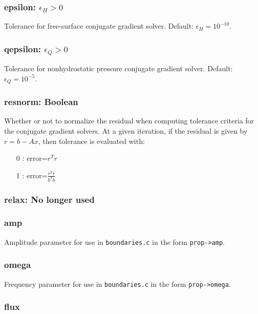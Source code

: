 \documentclass[12pt,oneside]{article}
\begin{document}
\subsubsection{epsilon: $\epsilon_H>0$}

Tolerance for free-surface conjugate gradient solver.  Default: $\epsilon_H=10^{-10}$.

\subsubsection{qepsilon: $\epsilon_Q>0$}

Tolerance for nonhydrostatic pressure conjugate gradient solver.  Default: $\epsilon_Q=10^{-5}$.

\subsubsection{resnorm: Boolean}

Whether or not to normalize the residual when computing tolerance criteria for the conjugate
gradient solvers.  At a given iteration, if the residual is given by $r=b-Ax$, then tolerance is evaluated with:
\begin{enumerate}
\item[0]: error=$r^T r$
\item[1]: error=$\frac{r^T r}{b^T b}$
\end{enumerate}

\subsubsection{relax: No longer used}

\subsubsection{amp}

Amplitude parameter for use in \verb+boundaries.c+ in the form \verb+prop->amp+.

\subsubsection{omega}

Frequency parameter for use in \verb+boundaries.c+ in the form \verb+prop->omega+.

\subsubsection{flux}
\end{document}
